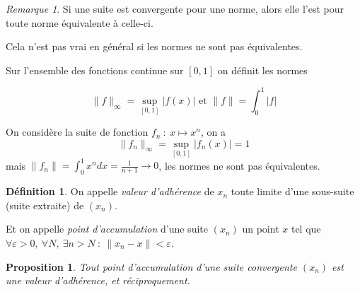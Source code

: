 \documentclass[]{article}
\newtheorem{myproposition}{Proposition}
\theoremstyle{remark}
\newtheorem{myrem}{Remarque}
\theoremstyle{definition}
\newtheorem{mydef}{Définition}
\begin{document}
\begin{myrem}
	Si une suite est convergente pour une norme, alors elle l'est pour toute norme équivalente à celle-ci.
	
	Cela n'est pas vrai en général si les normes ne sont pas équivalentes.
	
	Sur l'ensemble des fonctions continue sur $[0, 1]$ on définit les normes
	
	$$\|f\|_{\infty} = \sup_{[0,1]} |f(x)| \text{ et } \|f\| = \int_{0}^{1} |f|$$
	
	On considère la suite de fonction $f_n ~ : ~ x \longmapsto x^n$, on a $$\displaystyle \|f_n\|_{\infty} = \sup_{[0, 1]} |f_n(x)| = 1$$ mais $\|f_n\|=\int_{0}^{1}x^ndx=\frac{1}{n+1} \longrightarrow 0$, les normes ne sont pas équivalentes.
\end{myrem}

\begin{mydef}
	On appelle \textit{valeur d'adhérence} de $x_n$ toute limite d'une sous-suite (suite extraite) de $(x_n)$.
	
	Et on appelle \textit{point d'accumulation} d'une suite $(x_n)$ un point $x$ tel que $\forall \varepsilon > 0, ~ \forall N, ~ \exists n > N ~ : ~ \|x_n-x\| < \varepsilon$.
\end{mydef}

\begin{myproposition}
	Tout point d'accumulation d'une suite convergente $(x_n)$ est une valeur d'adhérence, et réciproquement.
\end{myproposition}
\end{document}
